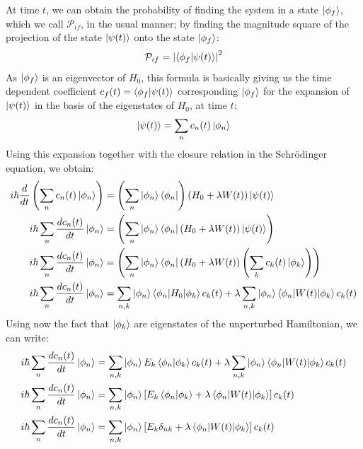 At time $t$, we can obtain the probability of finding the system in a state $\ket{\phi_f}$, which we call $\mathcal{P}_{if}$, in the usual manner; by finding the magnitude square of the projection of the state $\ket{\psi(t)}$ onto the state $\ket{\phi_f}$:
\begin{equation}
    \mathcal{P}_{if} = \left|\braket{\phi_f|\psi(t)}\right|^2
\end{equation}
As $\ket{\phi_f}$ is an eigenvector of $H_0$, this formula is basically giving us the time dependent coefficient $c_f(t) = \braket{\phi_f|\psi(t)}$ corresponding $\ket{\phi_f}$ for the expansion of $\ket{\psi(t)}$ in the basis of the eigenstates of $H_0$, at time $t$:
\begin{equation}
    \ket{\psi(t)} = \sum_n c_n(t) \ket{\phi_n}
\end{equation}
Using this expansion together with the closure relation in the Schrödinger equation, we obtain:
\begin{equation}
    \begin{split}
        i\hbar \frac{d}{dt}\left(\sum_n c_n(t) \ket{\phi_n}\right) &= \left( \sum_n \ket{\phi_n}\bra{\phi_n} \right)(H_0 + \lambda W(t)) \ket{\psi(t)}\\
        i\hbar \sum_n\frac{dc_n(t)}{dt} \ket{\phi_n} &= \left( \sum_n \ket{\phi_n}\bra{\phi_n} (H_0 + \lambda W(t)) \ket{\psi(t)}\right)\\
        i\hbar \sum_n\frac{dc_n(t)}{dt} \ket{\phi_n} &= \left( \sum_n \ket{\phi_n}\bra{\phi_n} (H_0 + \lambda W(t)) \left(\sum_k c_k(t) \ket{\phi_k}\right)\right)\\
        i\hbar \sum_n\frac{dc_n(t)}{dt} \ket{\phi_n} &= \sum_{n,k} \ket{\phi_n}\braket{\phi_n| H_0|\phi_k}c_k(t) + \lambda\sum_{n,k} \ket{\phi_n}\braket{\phi_n| W(t)|\phi_k}c_k(t)\\
    \end{split}
\end{equation}
Using now the fact that $\ket{\phi_k}$ are eigenstates of the unperturbed Hamiltonian, we can write:
\begin{equation}
    \begin{split}
        i\hbar \sum_n\frac{dc_n(t)}{dt} \ket{\phi_n} &= \sum_{n,k} \ket{\phi_n}E_k\braket{\phi_n|\phi_k}c_k(t) + \lambda\sum_{n,k} \ket{\phi_n}\braket{\phi_n| W(t)|\phi_k}c_k(t)\\
        i\hbar \sum_n\frac{dc_n(t)}{dt} \ket{\phi_n} &= \sum_{n,k} \ket{\phi_n}\left[E_k\braket{\phi_n|\phi_k} + \lambda\braket{\phi_n| W(t)|\phi_k}\right]c_k(t)\\
        i\hbar \sum_n\frac{dc_n(t)}{dt} \ket{\phi_n} &= \sum_{n,k} \ket{\phi_n}\left[E_k\delta_{nk} + \lambda\braket{\phi_n| W(t)|\phi_k}\right]c_k(t)\\
    \end{split}
\end{equation}
